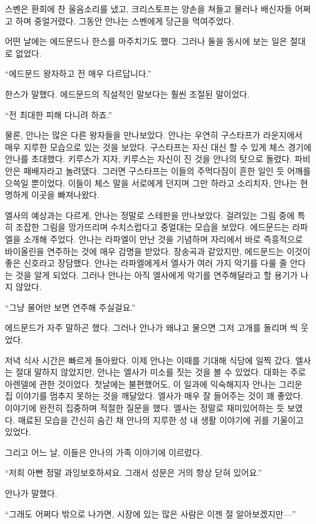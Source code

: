 스벤은 환희에 찬 울음소리를 냈고, 크리스토프는 양손을 쳐들고 물러나 배신자들 어쩌고 하며 중얼거렸다. 그동안 안나는 스벤에게 당근을 먹여주었다.

어떤 날에는 에드문드나 한스를 마주치기도 했다. 그러나 둘을 동시에 보는 일은 절대로 없었다.

``에드문드 왕자하고 전 매우 다르답니다.''

한스가 말했다. 에드문드의 직설적인 말보다는 훨씬 조절된 말이었다.

``전 최대한 피해 다니려 하죠.''

물론, 안나는 많은 다른 왕자들을 만나보았다. 안나는 우연히 구스타프가 라운지에서 매우 지루한 모습으로 있는 것을 보았다. 구스타프는 자신 대신 할 수 있게 체스 경기에 안나를 초대했다. 키루스가 지자, 키루스는 자신이 진 것을 안나의 탓으로 돌렸다. 파비안은 패배자라고 놀려댔다. 그러면 구스타프는 이들의 주먹다짐이 흔한 일인 듯 어깨를 으쓱일 뿐이었다. 이들이 체스 말을 서로에게 던지며 그만 하라고 소리치자, 안나는 현명하게 이곳을 빠져나왔다.

엘사의 예상과는 다르게, 안나는 정말로 스테판을 만나보았다. 걸려있는 그림 중에 특히 조잡한 그림을 망가뜨리며 수치스럽다고 중얼대는 모습을 보았다. 에드문드는 라파엘을 소개해 주었다. 안나는 라파엘이 만난 것을 기념하며 자리에서 바로 즉흥적으로 바이올린을 연주하는 것에 매우 감명을 받았다. 장송곡과 같았지만, 에드문드는 이것이 좋은 신호라고 장담했다. 안나는 라파엘에게서 엘사가 여러 가지 악기를 다룰 줄 안다는 것을 알게 되었다. 그러나 안나는 아직 엘사에게 악기를 연주해달라고 할 용기가 나지 않았다.

``그냥 물어만 보면 연주해 주실걸요.''

에드문드가 자주 말하곤 했다. 그러나 안나가 왜냐고 물으면 그저 고개를 돌리며 씩 웃었다.

저녁 식사 시간은 빠르게 돌아왔다. 이제 안나는 이때를 기대해 식당에 일찍 갔다. 엘사는 절대 말하지 않았지만, 안나는 엘사가 미소를 짓는 것을 볼 수 있었다. 대화는 주로 아렌델에 관한 것이었다. 첫날에는 불편했어도, 이 일과에 익숙해지자 안나는 그리운 집 이야기를 멈추지 못하는 것을 깨달았다. 엘사가 매우 잘 들어주는 것이 꽤 좋았다. 이야기에 완전히 집중하며 적절한 질문을 했다. 엘사는 정말로 재미있어하는 듯 보였다. 매료된 모습을 간신히 숨긴 채 안나의 지루한 성 내 생활 이야기에 귀를 기울이고 있었다.

그리고 어느 날, 이들은 안나의 가족 이야기에 이르렀다.

``저희 아빤 정말 과잉보호하셔요. 그래서 성문은 거의 항상 닫혀 있어요.''

안나가 말했다.

``그래도 어쩌다 밖으로 나가면, 시장에 있는 많은 사람은 이젠 절 알아보겠지만—''

